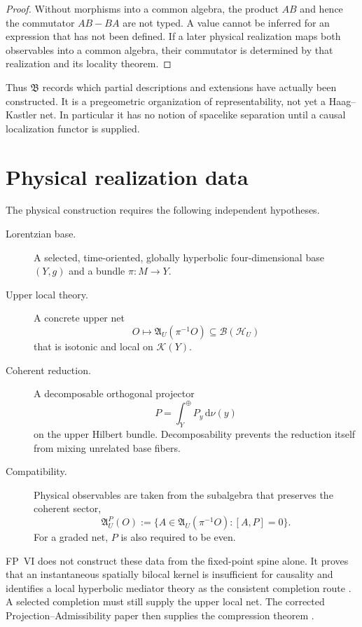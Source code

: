 \documentclass[11pt]{article}
\begin{document}
\begin{proof}
Without morphisms into a common algebra, the product $AB$ and hence the
commutator $AB-BA$ are not typed.  A value cannot be inferred for an expression
that has not been defined.  If a later physical realization maps both
observables into a common algebra, their commutator is determined by that
realization and its locality theorem.
\end{proof}

Thus $\mathfrak B$ records which partial descriptions and extensions have
actually been constructed.  It is a pregeometric organization of
representability, not yet a Haag--Kastler net.  In particular it has no notion
of spacelike separation until a causal localization functor is supplied.

\section{Physical realization data}

The physical construction requires the following independent hypotheses.

\begin{description}
\item[Lorentzian base.] A selected, time-oriented, globally hyperbolic
four-dimensional base $(Y,g)$ and a bundle $\pi:M\to Y$.

\item[Upper local theory.] A concrete upper net
\[
 O\longmapsto\mathfrak A_U(\pi^{-1}O)\subseteq\mathcal B(\mathcal H_U)
\]
that is isotonic and local on $\mathcal K(Y)$.

\item[Coherent reduction.] A decomposable orthogonal projector
\[
 P=\int_Y^\oplus P_y\,\mathrm d\nu(y)
\]
on the upper Hilbert bundle.  Decomposability prevents the reduction itself
from mixing unrelated base fibers.

\item[Compatibility.] Physical observables are taken from the subalgebra that
preserves the coherent sector,
\[
 \mathfrak A_U^P(O)
 :=\{A\in\mathfrak A_U(\pi^{-1}O):[A,P]=0\}.
\]
For a graded net, $P$ is also required to be even.
\end{description}

FP~VI does not construct these data from the fixed-point spine alone.  It
proves that an instantaneous spatially bilocal kernel is insufficient for
causality and identifies a local hyperbolic mediator theory as the consistent
completion route \cite{FPVIv4}.  A selected completion must still supply the
upper local net.  The corrected Projection--Admissibility paper then supplies
the compression theorem \cite{Projectionv2}.
\end{document}
